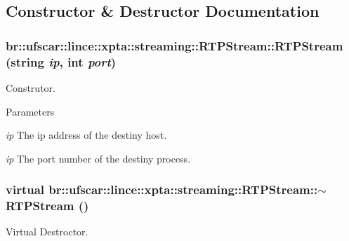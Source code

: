 \subsection{Constructor \& Destructor Documentation}
\hypertarget{classbr_1_1ufscar_1_1lince_1_1xpta_1_1streaming_1_1RTPStream_a300274e1616ad400ec01017774036a0d}{
\subsubsection[{RTPStream}]{\setlength{\rightskip}{0pt plus 5cm}br::ufscar::lince::xpta::streaming::RTPStream::RTPStream (string {\em ip}, \/  int {\em port})}}
\label{classbr_1_1ufscar_1_1lince_1_1xpta_1_1streaming_1_1RTPStream_a300274e1616ad400ec01017774036a0d}


Construtor. 


\begin{DoxyParams}{Parameters}
\item[{\em ip}]The ip address of the destiny host. \item[{\em ip}]The port number of the destiny process. \end{DoxyParams}
\hypertarget{classbr_1_1ufscar_1_1lince_1_1xpta_1_1streaming_1_1RTPStream_a9a30c281b508d24e4e9d877640570951}{
\subsubsection[{$\sim$RTPStream}]{\setlength{\rightskip}{0pt plus 5cm}virtual br::ufscar::lince::xpta::streaming::RTPStream::$\sim$RTPStream ()}}
\label{classbr_1_1ufscar_1_1lince_1_1xpta_1_1streaming_1_1RTPStream_a9a30c281b508d24e4e9d877640570951}


Virtual Destroctor. 



